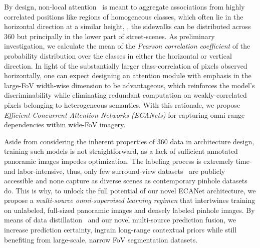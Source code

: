 \documentclass[final]{cvpr}
\begin{document}
By design, non-local attention~\cite{wang2018non} is meant to aggregate associations from highly correlated positions like regions of homogeneous classes, which often lie in the horizontal direction at a similar height, \eg, the sidewalks can be distributed across 360 but principally in the lower part of street-scenes. As preliminary investigation, we calculate the mean of the \emph{Pearson correlation coefficient}  of the probability distribution over the classes in either the horizontal  or vertical  direction.
In light of the substantially larger class-correlation of pixels observed horizontally, one can expect designing an attention module with emphasis in the large-FoV width-wise dimension to be advantageous, which reinforces the model's discriminability while eliminating redundant computation on weakly-correlated pixels belonging to heterogeneous semantics.
With this rationale, we propose \emph{Efficient Concurrent Attention Networks (ECANets)} for capturing omni-range dependencies within wide-FoV imagery.

Aside from considering the inherent properties of 360 data in architecture design, training such models is not straightforward, as a lack of sufficient annotated panoramic images impedes optimization.
The labeling process is extremely time- and labor-intensive, thus, only few surround-view datasets~\cite{sekkat202omniscape,wang2017torontocity,yogamani2019woodscape} are publicly accessible and none capture as diverse scenes as contemporary pinhole datasets~\cite{neuhold2017mapillary,varma2019idd} do.
This is why, to unlock the full potential of our novel ECANet architecture, we propose a \emph{multi-source omni-supervised learning regimen} that intertwines training on unlabeled, full-sized panoramic images and densely labeled pinhole images.
By means of data distillation~\cite{radosavovic2018data} and our novel multi-source prediction fusion, we increase prediction certainty, ingrain long-range contextual priors while still benefiting from large-scale, narrow FoV segmentation datasets.
\end{document}
